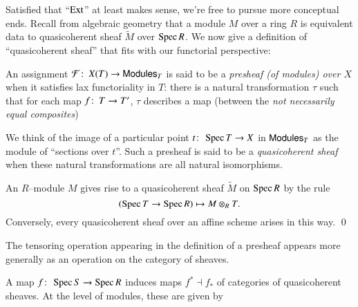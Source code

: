 Satisfied that ``$\operatorname{Ext}$'' at least makes sense, we're free to pursue more conceptual ends.  Recall from algebraic geometry that a module $M$ over a ring $R$ is equivalent data to quasicoherent sheaf $\widetilde{M}$ over $\operatorname{Spec} R$.  We now give a definition of ``quasicoherent sheaf'' that fits with our functorial perspective:
\begin{definition}\label{DefnQCohSheaves}
An assignment $\mathcal{F}\colon\thinspace X(T) \to \mathsf{Modules}_T$ is said to be a \textit{presheaf (of modules) over $X$} when it satisfies lax functoriality in $T$: there is a natural transformation $\tau$ such that for each map $f\colon\thinspace T \to T'$, $\tau$ describes a map (between the \emph{not necessarily equal composites})
\begin{center}
\end{center}
We think of the image of a particular point $t\colon\thinspace \operatorname{Spec} T \to X$ in $\mathsf{Modules}_T$ as the module of ``sections over $t$''.  Such a presheaf is said to be a \textit{quasicoherent sheaf} when these natural transformations are all natural isomorphisms.
\end{definition}

\begin{lemma}\label{CorrespondenceQCohAndModules}
An $R$--module $M$ gives rise to a quasicoherent sheaf $\widetilde M$ on $\operatorname{Spec} R$ by the rule \[(\operatorname{Spec} T \to \operatorname{Spec} R) \mapsto M \otimes_R T.\]  Conversely, every quasicoherent sheaf over an affine scheme arises in this way.  \qed
\end{lemma}

The tensoring operation appearing in the definition of a presheaf appears more generally as an operation on the category of sheaves.

\begin{definition}\label{PushAndPullForQCohOnAffines}
A map $f\colon\thinspace \operatorname{Spec} S \to \operatorname{Spec} R$ induces maps $f^* \dashv f_*$ of categories of quasicoherent sheaves.  At the level of modules, these are given by
\begin{center}
\end{center}
\end{definition}

